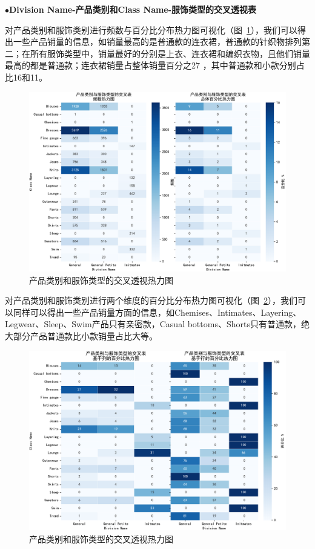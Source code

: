 \documentclass[
  journal=medium,
  manuscript=article-type,
  year=2023,
  volume=37,
]{cup-journal}
\begin{document}
$\bullet$\textbf{Division Name-产品类别和Class Name-服饰类型的交叉透视表}

对产品类别和服饰类别进行频数与百分比分布热力图可视化（图~\ref{overall}），我们可以得出一些产品销量的信息，如销量最高的是普通款的连衣裙，普通款的针织物排列第二；在所有服饰类型中，销量最好的分别是上衣、连衣裙和编织衣物，且他们销量最高的都是普通款；连衣裙销量占整体销量百分之27 ，其中普通款和小款分别占比16和11。

\begin{figure}[hbt!]
    \centering
    \includegraphics[width=0.8\linewidth]{overall.pdf}
    \caption{产品类别和服饰类型的交叉透视热力图}
    \label{overall}
\end{figure}


对产品类别和服饰类别进行两个维度的百分比分布热力图可视化（图~\ref{basexy}），我们可以同样可以得出一些产品销量方面的信息，如Chemises、Intimates、Layering、Legwear、Sleep、Swim产品只有亲密款，Casual bottoms、Shorts只有普通款，绝大部分产品普通款比小款销量占比大等。

\begin{figure}[hbt!]
    \centering
    \includegraphics[width=0.8\linewidth]{basexy.pdf}
    \caption{产品类别和服饰类型的交叉透视热力图}
    \label{basexy}
\end{figure}
\end{document}

